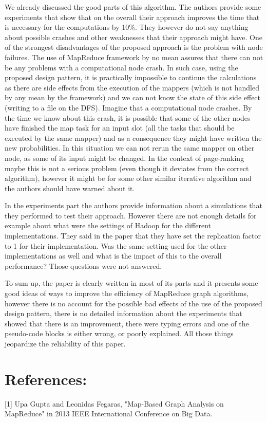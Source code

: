 \documentclass[12pt]{article}
\theoremstyle{plain}
\begin{document}
  We already discussed the good parts of this algorithm. The authors provide
  some experiments that show that on the overall their approach improves the 
  time that is necessary for the computations by 10\%. They however do not say
  anything about possible crashes and other weaknesses that their approach
  might have. One of the strongest disadvantages of the proposed approach is
  the problem with node failures. The use of MapReduce framework by no mean
  assures that there can not be any problems with a computational node crash.
  In such case, using the proposed design pattern, it is practically impossible
  to continue the calculations as there are side effects from the execution of
  the mappers (which is not handled by any mean by the framework) and we can
  not know the state of this side effect (writing to a file on the DFS).
  Imagine that a computational node crashes. By the time we know about this
  crash, it is possible that some of the other nodes have finished the map task
  for an input slot (all the tasks that should be executed by the same mapper)
  and as a consequence they might have written the new probabilities. In this
  situation we can not rerun the same mapper on other node, as some of its input
  might be changed. In the context of page-ranking maybe this is not a serious
  problem (even though it deviates from the correct algorithm), however it
  might be for some other similar iterative algorithm and the authors should
  have warned about it.  

In the experiments part the authors provide information about a simulations
that they performed to test their approach. However there are not enough details
for example about what were the settings of Hadoop for the different
implementations. They said in the paper that they have set the replication
factor to 1 for their implementation. Was the same setting used for the other
implementations as well and what is the impact of this to the overall 
performance? Those questions were not answered.

To sum up, the paper is clearly written in most of its parts and it presents
some good ideas of ways to improve the efficiency of MapReduce graph algorithms,
however there is no account for the possible bad effects of the use of the 
proposed design pattern, there is no detailed information about the experiments
that showed that there is an improvement, there were typing errors and one of
the pseudo-code blocks is either wrong, or poorly explained. All those things
jeopardize the reliability of this paper.

\section*{References:} %
\label{sec:References:}
[1] Upa Gupta and Leonidas Fegaras, "Map-Based Graph Analysis on MapReduce" in
  2013 IEEE International Conference on Big Data.
\end{document}
